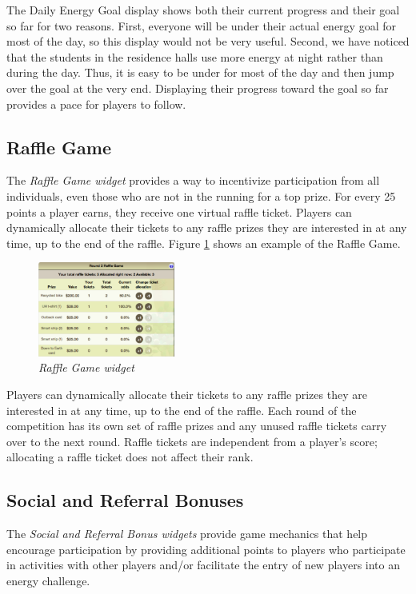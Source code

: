 The Daily Energy Goal display shows both their current progress and their goal so far for two reasons. First, everyone will be under their actual energy goal for most of the day, so this display would not be very useful. Second, we have noticed that the students in the residence halls use more energy at night rather than during the day. Thus, it is easy to be under for most of the day and then jump over the goal at the very end. Displaying their progress toward the goal so far provides a pace for players to follow.

\subsection{Raffle Game}

The {\em Raffle Game widget} provides a way to incentivize participation from all individuals, even those who are not in the running for a top prize. For every 25 points a player earns, they receive one virtual raffle ticket. Players can dynamically allocate their tickets to any raffle prizes they are interested in at any time, up to the end of the raffle.  Figure \ref{fig:RaffleGame} shows an example of the Raffle Game. 


\begin{figure}[th]
  \center
  \includegraphics[width=0.4\textwidth]{raffle-small.eps}
  \caption{\em \small Raffle Game widget}
  \label{fig:RaffleGame}
\end{figure}

Players can dynamically allocate their tickets to any raffle prizes they are interested in at any time, up to the end of the raffle. Each round of the competition has its own set of raffle prizes and any unused raffle tickets carry over to the next round. Raffle tickets are independent from a player's score; allocating a raffle ticket does not affect their rank. 

\subsection{Social and Referral Bonuses}

The {\em Social and Referral Bonus widgets} provide game mechanics that help encourage participation by providing additional points to players who participate in activities with other players and/or facilitate the entry of new players into an energy challenge.

